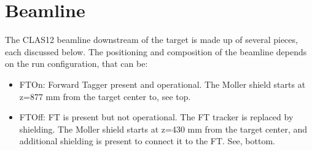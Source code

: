 \section{Beamline}

The CLAS12 beamline downstream of the target is made up of several pieces, each discussed below. The positioning and composition of the beamline
depends on the run configuration, that can be:

\begin{itemize}
	\item FTOn: Forward Tagger present and operational. The Moller shield starts at z=877 mm from the target center to, see  top.
	\item FTOff: FT is present but not operational. The FT tracker is replaced by shielding.
                 The Moller shield starts at z=430 mm from the target center, and additional shielding is present to connect it to the FT. See,  bottom.
\end{itemize}


